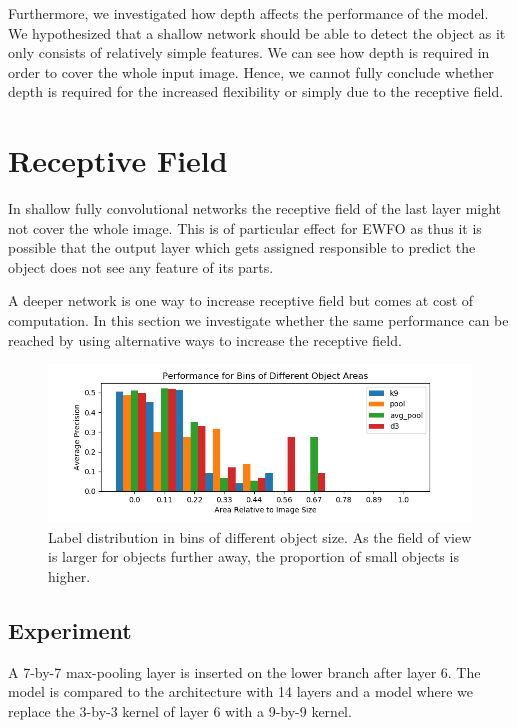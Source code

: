 	Furthermore, we investigated how depth affects the performance of the model. We hypothesized that a shallow network should be able to detect the object as it only consists of relatively simple features. We can see how depth is required in order to cover the whole input image. Hence, we cannot fully conclude whether depth is required for the increased flexibility or simply due to the receptive field. 
	
	\section{Receptive Field}
	
	In shallow fully convolutional networks the receptive field of the last layer might not cover the whole image. This is of particular effect for \ac{EWFO} as thus it is possible that the output layer which gets assigned responsible to predict the object does not see any feature of its parts.
	
	A deeper network is one way to increase receptive field but comes at cost of computation. In this section we investigate whether the same performance can be reached by using alternative ways to increase the receptive field.
	
	\begin{figure}[hbtp]
		\centering
		\includegraphics[width=\textwidth]{fig/rf_ap_size}
		\caption{Label distribution in bins of different object size. As the field of view is larger for objects further away, the proportion of small objects is higher.}
		\label{fig:size_bins}
	\end{figure}
	
	\subsection{Experiment}
	
	 A 7-by-7 max-pooling layer is inserted on the lower branch after layer 6. The model is compared to the architecture with 14 layers and a model where we replace the 3-by-3 kernel of layer 6 with a 9-by-9 kernel.
	 
